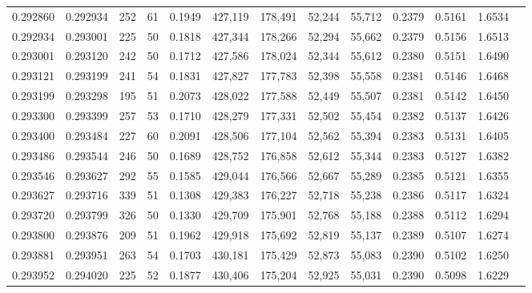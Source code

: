 \begin{tabular}{rrrrrrrrrrrrr}
0.292860 & 0.292934 &   252 &  61 &                                     0.1949 & 427,119 & 178,491 &  52,244 &  55,712 & 0.2379 & 0.5161 & 1.6534 \\
0.292934 & 0.293001 &   225 &  50 &                                     0.1818 & 427,344 & 178,266 &  52,294 &  55,662 & 0.2379 & 0.5156 & 1.6513 \\
0.293001 & 0.293120 &   242 &  50 &                                     0.1712 & 427,586 & 178,024 &  52,344 &  55,612 & 0.2380 & 0.5151 & 1.6490 \\
0.293121 & 0.293199 &   241 &  54 &                                     0.1831 & 427,827 & 177,783 &  52,398 &  55,558 & 0.2381 & 0.5146 & 1.6468 \\
0.293199 & 0.293298 &   195 &  51 &                                     0.2073 & 428,022 & 177,588 &  52,449 &  55,507 & 0.2381 & 0.5142 & 1.6450 \\
0.293300 & 0.293399 &   257 &  53 &                                     0.1710 & 428,279 & 177,331 &  52,502 &  55,454 & 0.2382 & 0.5137 & 1.6426 \\
0.293400 & 0.293484 &   227 &  60 &                                     0.2091 & 428,506 & 177,104 &  52,562 &  55,394 & 0.2383 & 0.5131 & 1.6405 \\
0.293486 & 0.293544 &   246 &  50 &                                     0.1689 & 428,752 & 176,858 &  52,612 &  55,344 & 0.2383 & 0.5127 & 1.6382 \\
0.293546 & 0.293627 &   292 &  55 &                                     0.1585 & 429,044 & 176,566 &  52,667 &  55,289 & 0.2385 & 0.5121 & 1.6355 \\
0.293627 & 0.293716 &   339 &  51 &                                     0.1308 & 429,383 & 176,227 &  52,718 &  55,238 & 0.2386 & 0.5117 & 1.6324 \\
0.293720 & 0.293799 &   326 &  50 &                                     0.1330 & 429,709 & 175,901 &  52,768 &  55,188 & 0.2388 & 0.5112 & 1.6294 \\
0.293800 & 0.293876 &   209 &  51 &                                     0.1962 & 429,918 & 175,692 &  52,819 &  55,137 & 0.2389 & 0.5107 & 1.6274 \\
0.293881 & 0.293951 &   263 &  54 &                                     0.1703 & 430,181 & 175,429 &  52,873 &  55,083 & 0.2390 & 0.5102 & 1.6250 \\
0.293952 & 0.294020 &   225 &  52 &                                     0.1877 & 430,406 & 175,204 &  52,925 &  55,031 & 0.2390 & 0.5098 & 1.6229 \\

\end{tabular}
